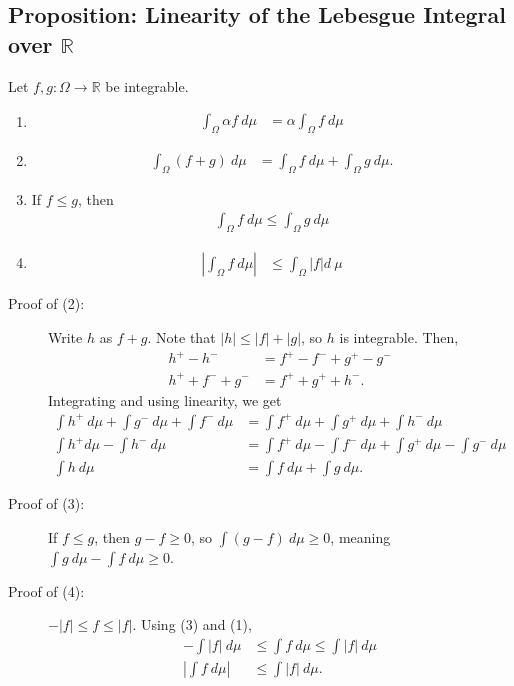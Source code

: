 \documentclass[9pt]{extarticle}
\newcommand{\R}{\mathbb{R}}
\begin{document}
  \subsection{Proposition: Linearity of the Lebesgue Integral over $\R$}%
  Let $f,g: \Omega \rightarrow \R$ be integrable.
  \begin{enumerate}[(1)]
    \item 
      \begin{align*}
        \int_{\Omega}\alpha f~d\mu &= \alpha\int_{\Omega}f~d\mu
      \end{align*}
    \item 
    \begin{align*}
      \int_{\Omega}(f+g)~d\mu &= \int_{\Omega}f~d\mu + \int_{\Omega}g~d\mu.
    \end{align*}
    \item If $f\leq g$, then
      \begin{align*}
        \int_{\Omega}f~d\mu \leq \int_{\Omega}g~d\mu
      \end{align*}
    \item 
      \begin{align*}
        \left|\int_{\Omega}f~d\mu\right| &\leq \int_{\Omega}|f|d~\mu
      \end{align*}
  \end{enumerate}
  \begin{description}
    \item[Proof of (2):] Write $h$ as $f + g$. Note that $|h| \leq |f| + |g|$, so $h$ is integrable. Then, 
      \begin{align*}
        h^{+} - h^{-} &= f^{+} - f^{-} + g^{+} - g^{-}\\
        h^{+} + f^{-} + g^{-} &= f^{+} + g^{+} + h^{-}.
      \end{align*}
      Integrating and using linearity, we get
      \begin{align*}
        \int h^{+}~d\mu+\int g^{-}~d\mu+\int f^{-}~d\mu &= \int f^{+}~d\mu + \int g^{+}~d\mu + \int h^{-}~d\mu\\
        \int h^{+} d\mu - \int h^{-}~d\mu &= \int f^{+}~d\mu - \int f^{-}~d\mu + \int g^{+}~d\mu - \int g^{-}~d\mu\\
        \int h~d\mu &= \int f~d\mu + \int g~d\mu.
      \end{align*}
    \item[Proof of (3):] If $f\leq g$, then $g-f \geq 0$, so $\int(g-f)~d\mu \geq 0$, meaning $\int g~d\mu - \int f~d\mu \geq 0$.
    \item[Proof of (4):] $-|f| \leq f \leq |f|$. Using (3) and (1),
      \begin{align*}
        -\int |f|~d\mu &\leq \int f~d\mu \leq \int |f|~d\mu\\
        \left|\int f~d\mu\right| &\leq \int |f|~d\mu.
      \end{align*}
  \end{description}
\end{document}
